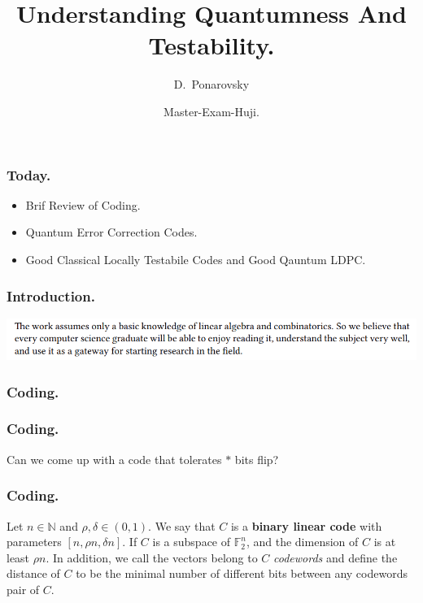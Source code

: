 \documentclass[usenames, aspectratio=169]{beamer}
\title[Understanding Quantumness And Testability.] %
{Understanding Quantumness And Testability.}
\subtitle{  }
\author[D.~Ponarovsky] %
	{D.~Ponarovsky\inst{1}}
\institute[HUJI] %
{  Faculty of Computer Science\newline
  Hebrew University of Jerusalem
}
\date[2023] %
{Master-Exam-Huji.}
\newcommand{\pslsq}[4]{
\begin{frame}
    \frametitle{#1} 
    \texttt{[image: \#3]}
    #4  
  \end{frame}
}
\begin{document}

\begin{frame}
  \maketitle
\end{frame}

\begin{frame}
  \frametitle{ Today. }
  \begin{itemize}
    \item<1-> Brif Review of Coding. 
    \item<2-> Quantum Error Correction Codes.
    \item<3->Good Classical Locally Testabile Codes and Good Qauntum LDPC.
  \end{itemize} 
\end{frame}


\begin{frame}
  \frametitle{Introduction.}
  \includegraphics[width=.7\linewidth]{./Assumption-out.png}
\end{frame}



\begin{frame}
  \frametitle{ Coding. }
  \begin{center}
\end{center}
\end{frame}

\begin{frame}
  \frametitle{ Coding. }
  Can we come up with a code that tolerates $*$ bits flip? 
\end{frame} 

\begin{frame}
  \frametitle{ Coding. }
\begin{definition} 
  Let $n \in \mathbb{N}$ and $\rho, \delta\in \left( 0,1 \right)$. We say that $C$ is a \textbf{binary linear code} with parameters $[n, \rho n, \delta n]$. If $C$ is a subspace of $\mathbb{F}_{2}^{n}$, and the dimension of $C$ is at least $\rho n$. In addition, we call the vectors belong to $C$ \textit{codewords} and define the distance of $C$ to be the minimal number of different bits between any codewords pair of $C$.   
  \end{definition}
\end{frame} 
\end{document}
